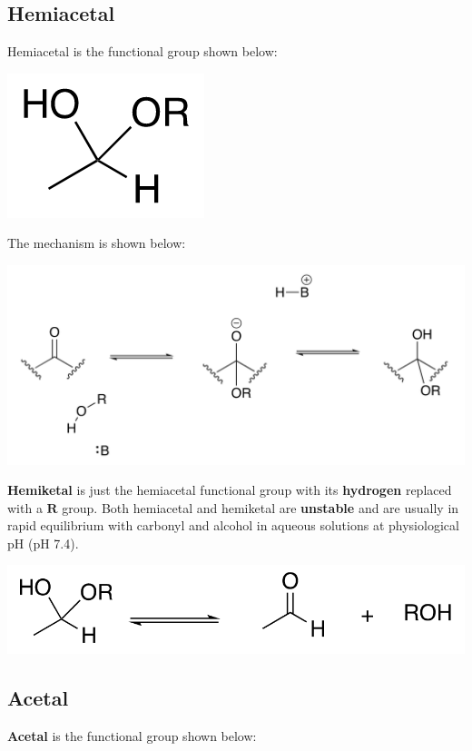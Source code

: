\documentclass[11pt]{article}
\begin{document}
\newpage
\subsection{Hemiacetal}
\label{sec:org969c1d4}
Hemiacetal is the functional group shown below:

\begin{center}
\includegraphics[scale=1.0]{./images/hemiacetal.png}
\end{center}

The mechanism is shown below:
\begin{center}
\includegraphics[width=.9\linewidth]{./images/hemiacetal-mechanism.png}
\end{center}

\textbf{Hemiketal} is just the hemiacetal functional group with its \textbf{hydrogen} replaced with a \(\boldsymbol{R}\) group. Both hemiacetal and hemiketal are \textbf{unstable} and are usually in rapid equilibrium with carbonyl and alcohol in aqueous solutions at physiological pH (pH 7.4).
\begin{center}
\includegraphics[width=.9\linewidth]{./images/hemiacetal-equilibria.png}
\end{center}

\newpage
\subsection{Acetal}
\label{sec:orgcaca0f2}
\textbf{Acetal} is the functional group shown below:
\end{document}
